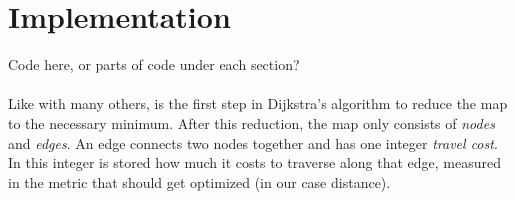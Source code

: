 \section{Implementation}
\label{sec:map} %
Code here, or parts of code under each section?\\
\\
Like with many others,
is the first step in Dijkstra's algorithm to reduce the map to the necessary minimum.
After this reduction, the map only consists of \emph{nodes} and \emph{edges}.
An edge connects two nodes together and has one integer \emph{travel cost}.
In this integer is stored how much it costs to traverse along that edge,
measured in the metric that should get optimized (in our case distance).


